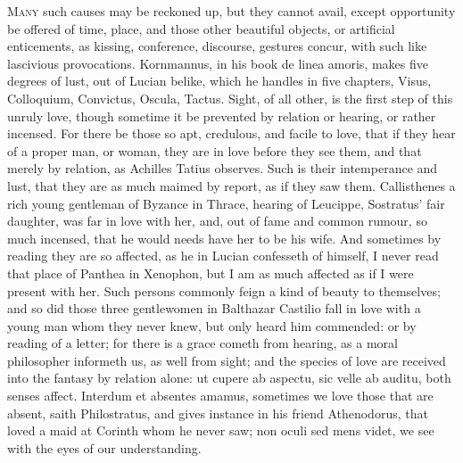 {\lettrine{M}{any} such causes may be reckoned up, but they cannot avail, except
opportunity be offered of time, place, and those other beautiful
objects, or artificial enticements, as kissing, conference, discourse,
gestures concur, with such like lascivious provocations. Kornmannus, in
his book de linea amoris, makes five degrees of lust, out of
Lucian belike, which he handles in five chapters, Visus,
Colloquium, Convictus, Oscula, Tactus. Sight, of all other, is
the first step of this unruly love, though sometime it be prevented by
relation or hearing, or rather incensed. For there be those so apt,
credulous, and facile to love, that if they hear of a proper man, or
woman, they are in love before they see them, and that merely by
relation, as Achilles Tatius observes. Such is their intemperance
and lust, that they are as much maimed by report, as if they saw them.
Callisthenes a rich young gentleman of Byzance in Thrace, hearing of
Leucippe, Sostratus' fair daughter, was far in love with her,
and, out of fame and common rumour, so much incensed, that he would
needs have her to be his wife. And sometimes by reading they are so
affected, as he in Lucian confesseth of himself, I never read
that place of Panthea in Xenophon, but I am as much affected as if I
were present with her. Such persons commonly feign a kind of
beauty to themselves; and so did those three gentlewomen in
Balthazar Castilio fall in love with a young man whom they never
knew, but only heard him commended: or by reading of a letter; for
there is a grace cometh from hearing,  as a moral philosopher
informeth us, as well from sight; and the species of love are received
into the fantasy by relation alone: ut cupere ab aspectu, sic
velle ab auditu, both senses affect. Interdum et absentes amamus,
sometimes we love those that are absent, saith Philostratus, and gives
instance in his friend Athenodorus, that loved a maid at Corinth whom
he never saw; non oculi sed mens videt, we see with the eyes of our
understanding.

}
